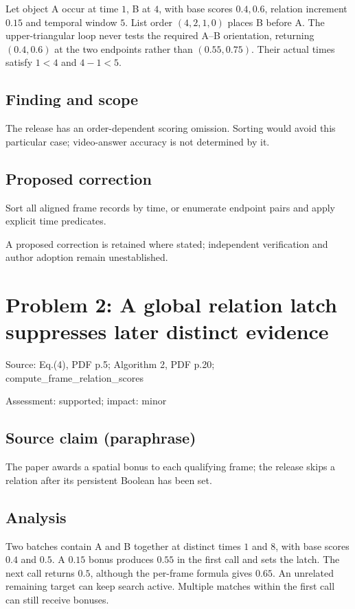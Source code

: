 \documentclass[11pt]{article}
\begin{document}
Let object A occur at time \(1\), B at \(4\), with base scores \(0.4,0.6\), relation increment \(0.15\) and temporal window \(5\). List order \((4,2,1,0)\) places B before A. The upper-triangular loop never tests the required A–B orientation, returning \((0.4,0.6)\) at the two endpoints rather than \((0.55,0.75)\). Their actual times satisfy \(1<4\) and \(4-1<5\).

\subsection*{Finding and scope}

The release has an order-dependent scoring omission. Sorting would avoid this particular case; video-answer accuracy is not determined by it.

\subsection*{Proposed correction}

Sort all aligned frame records by time, or enumerate endpoint pairs and apply explicit time predicates.

A proposed correction is retained where stated; independent verification and author adoption remain unestablished.

\section*{Problem 2: A global relation latch suppresses later distinct evidence}

Source: Eq.(4), PDF p.5; Algorithm 2, PDF p.20; compute\_frame\_relation\_scores

Assessment: supported; impact: minor

\subsection*{Source claim (paraphrase)}

The paper awards a spatial bonus to each qualifying frame; the release skips a relation after its persistent Boolean has been set.

\subsection*{Analysis}

Two batches contain A and B together at distinct times \(1\) and \(8\), with base scores \(0.4\) and \(0.5\). A \(0.15\) bonus produces \(0.55\) in the first call and sets the latch. The next call returns \(0.5\), although the per-frame formula gives \(0.65\). An unrelated remaining target can keep search active. Multiple matches within the first call can still receive bonuses.
\end{document}
